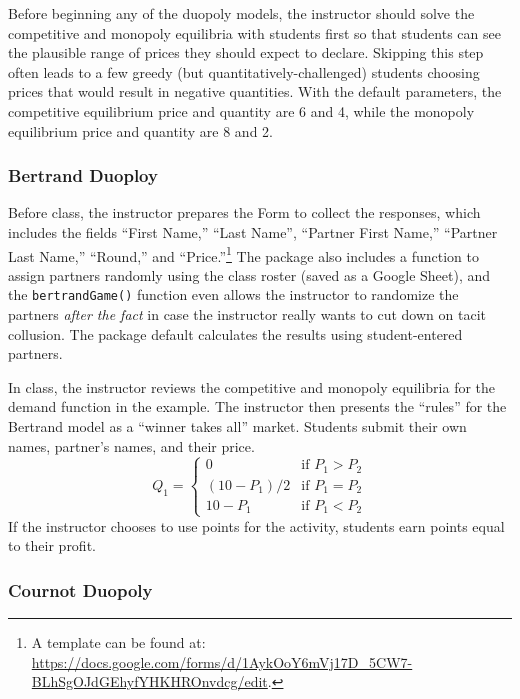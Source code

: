 \documentclass[
]{article}
\begin{document}
Before beginning any of the duopoly models, the instructor should solve
the competitive and monopoly equilibria with students first so that
students can see the plausible range of prices they should expect to
declare. Skipping this step often leads to a few greedy (but
quantitatively-challenged) students choosing prices that would result in
negative quantities. With the default parameters, the competitive
equilibrium price and quantity are 6 and 4, while the monopoly
equilibrium price and quantity are 8 and 2.

\hypertarget{bertrand-duoploy}{%
\subsubsection{Bertrand Duoploy}\label{bertrand-duoploy}}

Before class, the instructor prepares the Form to collect the responses,
which includes the fields ``First Name,'' ``Last Name'', ``Partner First
Name,'' ``Partner Last Name,'' ``Round,'' and ``Price.''\footnote{A
  template can be found at:\\
  \url{https://docs.google.com/forms/d/1AykOoY6mVj17D_5CW7-BLhSgOJdGEhyfYHKHROnvdcg/edit}.}
The package also includes a function to assign partners randomly using
the class roster (saved as a Google Sheet), and the
\texttt{bertrandGame()} function even allows the instructor to randomize
the partners \emph{after the fact} in case the instructor really wants
to cut down on tacit collusion. The package default calculates the
results using student-entered partners.

In class, the instructor reviews the competitive and monopoly equilibria
for the demand function in the example. The instructor then presents the
``rules'' for the Bertrand model as a ``winner takes all'' market.
Students submit their own names, partner's names, and their price. \[
Q_1 = \begin{cases}
    0 & \text{if } P_1 > P_2 \\ 
    (10 - P_1)/2 & \text{if } P_1 = P_2 \\
    10 - P_1 & \text{if } P_1 < P_2 
\end{cases}
\] If the instructor chooses to use points for the activity, students
earn points equal to their profit.

\hypertarget{cournot-duopoly}{%
\subsubsection{Cournot Duopoly}\label{cournot-duopoly}}
\end{document}
